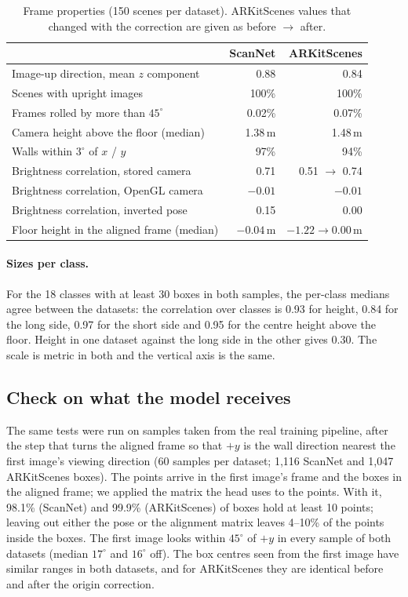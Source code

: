 \begin{table}[t]
\centering
\caption{Frame properties (150 scenes per dataset). ARKitScenes values that changed with the correction are
given as before $\rightarrow$ after.}
\label{tab:vggtdet-frame}
\begin{tabular}{lrr}
\toprule
 & ScanNet & ARKitScenes \\
\midrule
Image-up direction, mean $z$ component          & 0.88 & 0.84 \\
Scenes with upright images                       & 100\% & 100\% \\
Frames rolled by more than $45^\circ$            & 0.02\% & 0.07\% \\
Camera height above the floor (median)           & 1.38\,m & 1.48\,m \\
Walls within $3^\circ$ of $x$ / $y$              & 97\% & 94\% \\
Brightness correlation, stored camera            & 0.71 & 0.51 $\rightarrow$ 0.74 \\
Brightness correlation, OpenGL camera            & $-0.01$ & $-0.01$ \\
Brightness correlation, inverted pose            & 0.15 & 0.00 \\
Floor height in the aligned frame (median)       & $-0.04$\,m & $-1.22 \rightarrow 0.00$\,m \\
\bottomrule
\end{tabular}
\end{table}

\paragraph{Sizes per class.}
For the 18 classes with at least 30 boxes in both samples, the per-class medians agree between the datasets:
the correlation over classes is 0.93 for height, 0.84 for the long side, 0.97 for the short side and 0.95 for
the centre height above the floor. Height in one dataset against the long side in the other gives 0.30. The
scale is metric in both and the vertical axis is the same.

\subsection{Check on what the model receives}

The same tests were run on samples taken from the real training pipeline, after the step that turns the
aligned frame so that $+y$ is the wall direction nearest the first image's viewing direction
(60 samples per dataset; 1,116 ScanNet and 1,047 ARKitScenes boxes). The points arrive in the first image's
frame and the boxes in the aligned frame; we applied the matrix the head uses to the points. With it, 98.1\%
(ScanNet) and 99.9\% (ARKitScenes) of boxes hold at least 10 points; leaving out either the pose or the
alignment matrix leaves 4--10\% of the points inside the boxes. The first image looks within $45^\circ$ of
$+y$ in every sample of both datasets (median $17^\circ$ and $16^\circ$ off). The box centres seen from the
first image have similar ranges in both datasets, and for ARKitScenes they are identical before and after the
origin correction.

